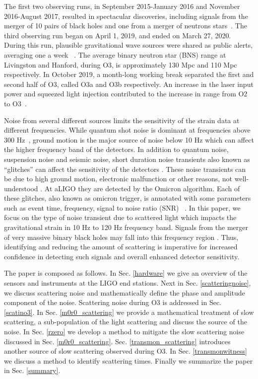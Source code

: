 \documentclass[12pt]{iopart}
\begin{document}
The first two observing runs, in September 2015-January 2016 and November 2016-August 2017, resulted in spectacular discoveries, including signals from the merger of 10 pairs of black holes and one from a merger of neutrons stars~\cite{Abbott_2019,Abbott_2016,TheLIGOScientific:2017qsa}. The third observing run began on April 1, 2019, and ended on March 27, 2020. During this run, plausible gravitational wave sources were shared as public alerts, averaging one a week ~\cite{gracedb}. The average binary neutron star (BNS) range at Livingston and Hanford, during O3, is approximately 130 Mpc and 110 Mpc respectively. In October 2019, a month-long working break separated the first and second half of O3, called O3a and O3b respectively. An increase in the laser input power and squeezed light injection contributed to the increase in range from O2 to O3~\cite{prospect}.


Noise from several different sources limits the sensitivity of the strain data at different frequencies. 
While quantum shot noise is dominant at frequencies above 300 Hz~\cite{tjthesis}, ground motion is the major source of noise below 10 Hz which can affect the higher frequency band of the detectors. In addition to quantum noise, suspension noise and seismic noise, short duration noise transients also known as ``glitches'' can affect the sensitivity of the detectors \cite{transientpaper}. These noise transients can be due to high ground motion, electronic malfunction or other reasons, not well-understood \cite{Nuttall_2018,noisepaper,Cabero_2019}. At aLIGO they are detected by the Omicron algorithm. Each of these glitches, also known as omicron trigger, is annotated with some parameters such as event time, frequency, signal to noise ratio (SNR) ~\cite{omicron_florent,robinet2020omicron,McIver:2015pms}. In this paper, we focus on the type of noise transient due to scattered light which impacts the gravitational strain in 10 Hz to 120 Hz frequency band. Signals from the merger of very massive binary black holes may fall into this frequency region \cite{GW190521Adiscovery}. Thus, identifying and reducing the amount of scattering is imperative for increased confidence in detecting such signals and overall enhanced detector sensitivity. 
 
The paper is composed as follows. In Sec. \ref{hardware} we give an overview of the sensors and instruments at the LIGO end stations. Next in Sec. \ref{scatteringnoise}, we discuss scattering noise and mathematically define the phase and amplitude component of the noise. Scattering noise during O3 is addressed in Sec. \ref{scatino3}. In Sec. \ref{m0r0_scattering} we provide a mathematical treatment of slow scattering, a sub-population of the light scattering and discuss the source of the noise. In Sec. \ref{rzero} we develop a method to mitigate the slow scattering noise discussed in Sec. \ref{m0r0_scattering}. Sec. \ref{transmon_scattering} introduces another source of slow scattering observed during O3. In Sec. \ref{transmonwitness} we discuss a method to identify scattering times. Finally we summarize the paper in Sec. \ref{summary}. 
\end{document}
